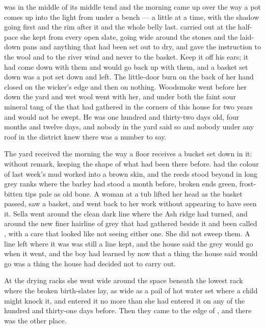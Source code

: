 
 was in the middle of its middle tend and the morning came up over  the way a pot comes up into the light from under a bench --- a little at a time, with the shadow going first and the rim after it and the whole belly last.  carried  out at the half-pace she kept from every open slate, going wide around the stones and the laid-down pans and anything that had been set out to dry, and gave the instruction to the wool and to the river wind and never to the basket. Keep it off his ears; it had come down with them and would go back up with them, and a basket set down was a pot set down and left. The little-door burn on the back of her hand closed on the wicker's edge and then on nothing. Woodsmoke went before her down the yard and wet wool went with her, and under both the faint sour mineral tang of the  that had gathered in the corners of this house for two years and would not be swept. He was one hundred and thirty-two days old, four months and twelve days, and nobody in the yard said so and nobody under any roof in the district knew there was a number to say.

The yard received the morning the way a floor receives a bucket set down in it: without remark, keeping the shape of what had been there before.  had the colour of last week's mud worked into a brown skin, and the reeds stood beyond  in long grey ranks where the barley had stood a month before, broken ends green, frost-bitten tips pale as old bone. A woman at a tub lifted her head as the basket passed, saw a basket, and went back to her work without appearing to have seen it. Sella went around the clean dark line where the Ash ridge had turned, and around the new finer hairline of grey that had gathered beside it and been called , with a care that looked like not seeing either one. She did not sweep them. A line left where it was was still a line kept, and the house said the grey would go when it went, and the boy had learned by now that a thing the house said would go was a thing the house had decided not to carry out.

At the drying racks she went wide around the space beneath the lowest rack where the broken birth-slates lay, as wide as a pail of hot water set where a child might knock it, and entered it no more than she had entered it on any of the hundred and thirty-one days before. Then they came to the edge of , and there was the other place.

